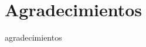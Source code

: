 \chapter*{Agradecimientos}
\thispagestyle{empty} 

agradecimientos

\newpage 

\ %
\thispagestyle{empty} 
